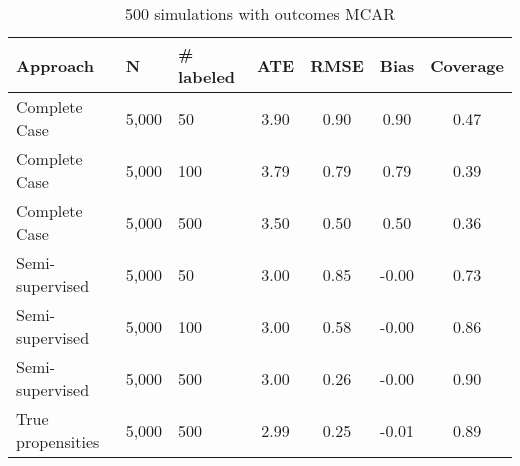 \begin{table}[ht]
\centering
\begingroup\small
\begin{tabular}{lllcccc}
  \hline
Approach & N & \# labeled & ATE & RMSE & Bias & Coverage \\ 
  \hline
  Complete Case & 5,000 &  50 & 3.90 & 0.90 & 0.90 & 0.47 \\ 
  Complete Case & 5,000 & 100 & 3.79 & 0.79 & 0.79 & 0.39 \\ 
Complete Case & 5,000 & 500 & 3.50 & 0.50 & 0.50 & 0.36 \\ 
  Semi-supervised & 5,000 &  50 & 3.00 & 0.85 & -0.00 & 0.73 \\ 
  Semi-supervised & 5,000 & 100 & 3.00 & 0.58 & -0.00 & 0.86 \\ 
  Semi-supervised & 5,000 & 500 & 3.00 & 0.26 & -0.00 & 0.90 \\ 
  True propensities & 5,000 & 500 & 2.99 & 0.25 & -0.01 & 0.89 \\ 
   \hline
\end{tabular}
\endgroup
\caption{500 simulations with outcomes MCAR} 
\end{table}
